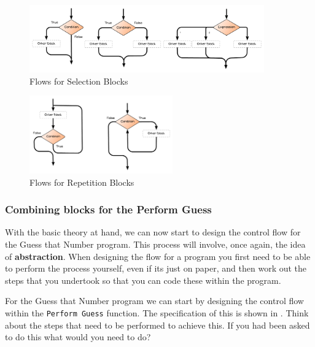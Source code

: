 \begin{figure}[h]
   \centering
   \includegraphics[width=0.9\textwidth]{./topics/control-flow/diagrams/SelectionFlow} 
   \caption{Flows for Selection Blocks}
   \label{fig:selection-flow}
\end{figure}

\begin{figure}[h]
   \centering
   \includegraphics[width=0.55\textwidth]{./topics/control-flow/diagrams/RepetitionFlow} 
   \caption{Flows for Repetition Blocks}
   \label{fig:repetition-flow}
\end{figure}


\subsubsection{Combining blocks for the Perform Guess} %
\label{ssub:combining_blocks_for_the_guessing_game}

With the basic theory at hand, we can now start to design the control flow for the Guess that Number program. This process will involve, once again, the idea of \textbf{abstraction}. When designing the flow for a program you first need to be able to perform the process yourself, even if its just on paper, and then work out the steps that you undertook so that you can code these within the program.

For the Guess that Number program we can start by designing the control flow within the \texttt{Perform Guess} function. The specification of this is shown in . Think about the steps that need to be performed to achieve this. If you had been asked to do this what would you need to do?

